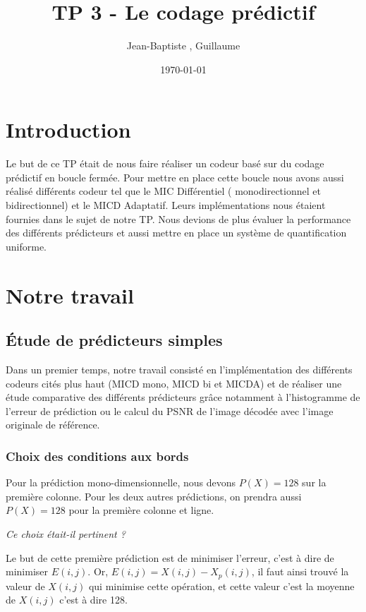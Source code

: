 \documentclass[12pt]{report}
\title{TP 3 - Le codage prédictif}
\author{Jean-Baptiste \bsc{Morice}, Guillaume \bsc{Versal}}
\date{\today}
\renewcommand{\emph}{\textit}
\begin{document}
\maketitle

\tableofcontents

\newpage
\section*{Introduction}

Le but de ce TP était de nous faire réaliser un  codeur basé sur du codage prédictif en boucle fermée. Pour mettre en place cette boucle nous avons aussi réalisé différents codeur tel que le MIC Différentiel ( monodirectionnel et bidirectionnel) et le MICD Adaptatif. Leurs implémentations nous étaient fournies dans le sujet de notre TP. Nous devions de plus évaluer la performance des différents prédicteurs et aussi mettre en place un système de quantification uniforme.


\newpage
\section{Notre travail}

\subsection{Étude de prédicteurs simples}

Dans un premier temps, notre travail consisté en l'implémentation des différents codeurs cités plus haut (MICD mono, MICD bi et MICDA) et de réaliser une étude comparative des différents prédicteurs grâce notamment à l'histogramme de l'erreur de prédiction ou le calcul du PSNR de l'image décodée avec l'image originale de référence.

\subsubsection{Choix des conditions aux bords}

Pour la prédiction mono-dimensionnelle,  nous devons $P(X) = 128$ sur la première colonne. Pour les deux autres prédictions, on prendra aussi $P(X) = 128$ pour la première colonne et ligne. 

\emph{Ce choix était-il pertinent ?}

Le but de cette première prédiction est de minimiser l'erreur, c'est à dire de minimiser $E(i,j)$. Or, $E(i,j) = X(i,j) - X_p(i,j)$, il faut ainsi trouvé la valeur de $X(i,j)$ qui minimise cette opération, et cette valeur c'est la moyenne de $X(i,j)$ c'est à dire 128.
\end{document}
